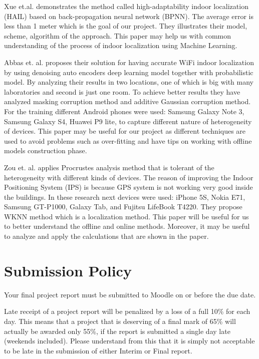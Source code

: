 \documentclass[]{final_report}
\begin{document}
Xue et.al. \cite{Jianzhe:2020} demonstrates the method called high-adaptability indoor localization (HAIL) based on back-propagation neural network (BPNN). The average error is less than 1 meter which is the goal of our project. They illustrates their model, scheme, algorithm of the approach. This paper may help us with common understanding of the process of indoor localization using Machine Learning. 


Abbas et. al. \cite{Abbas:2019} proposes their solution for having accurate WiFi indoor localization by using denoising auto encoders deep learning model together with probabilistic model. By analyzing their results in two locations, one of which is big with many laboratories and second is just one room. To achieve better results they have analyzed masking corruption method and additive Gaussian corruption method. For the training different Android phones were used: Samsung Galaxy Note 3, Samsung Galaxy S4, Huawei P9 lite, to capture different nature of heterogeneity of devices. This paper may be useful for our project as different techniques are used to avoid problems such as over-fitting and have tips on working with offline models construction phase.

Zou et. al. \cite{Zou:2016} applies Procrustes analysis method that is tolerant of the heterogeneity with different kinds of devices. The reason of improving the Indoor Positioning System (IPS) is because GPS system is not working very good inside the buildings. In these research next devices were used: iPhone 5S, Nokia E71, Samsung GT-P1000, Galaxy Tab, and Fujitsu LifeBook T4220. They propose WKNN method which is a localization method. This paper will be useful for us to better understand the offline and online methods. Moreover, it may be useful to analyze and apply the calculations that are shown in the paper.   


\chapter{\label{chapter2}Submission Policy}

Your final project report must be submitted to Moodle on or before the due date.

Late receipt of a project report will be penalized by a loss of a full 10\% for each day. This means that a project that is deserving of a final mark of 65\% will actually be awarded only 55\%, if the report is submitted a single day late (weekends included). Please understand from this that it is simply not acceptable to be late in the submission of either Interim or Final report.
\end{document}
